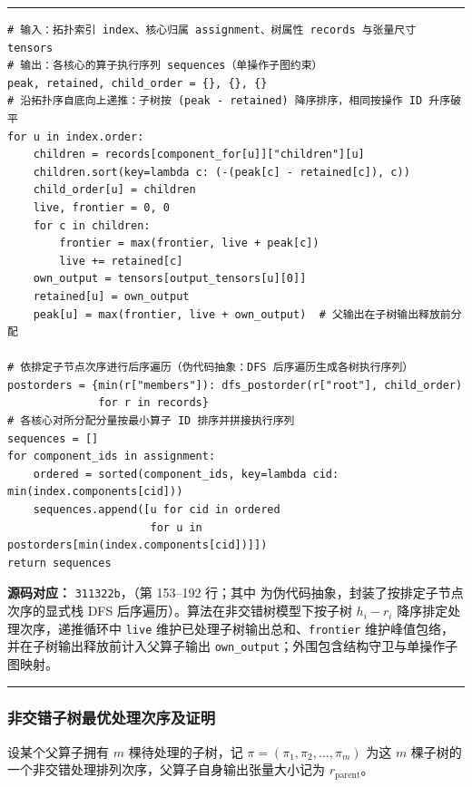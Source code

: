 \documentclass[anonymous,withtoc]{gmcm2026}
\begin{document}
\par{}\begingroup\normalsize
\captionsetup{type=algorithm,position=top,justification=raggedright,singlelinecheck=false,labelfont=bf}
\label{alg:p3-forest-memory-order}
\nopagebreak\hrule\nopagebreak


\begin{lstlisting}[style=paperpseudo]
# 输入：拓扑索引 index、核心归属 assignment、树属性 records 与张量尺寸 tensors
# 输出：各核心的算子执行序列 sequences（单操作子图约束）
peak, retained, child_order = {}, {}, {}
# 沿拓扑序自底向上递推：子树按 (peak - retained) 降序排序，相同按操作 ID 升序破平
for u in index.order:
    children = records[component_for[u]]["children"][u]
    children.sort(key=lambda c: (-(peak[c] - retained[c]), c))
    child_order[u] = children
    live, frontier = 0, 0
    for c in children:
        frontier = max(frontier, live + peak[c])
        live += retained[c]
    own_output = tensors[output_tensors[u][0]]
    retained[u] = own_output
    peak[u] = max(frontier, live + own_output)  # 父输出在子树输出释放前分配

# 依排定子节点次序进行后序遍历（伪代码抽象：DFS 后序遍历生成各树执行序列）
postorders = {min(r["members"]): dfs_postorder(r["root"], child_order)
              for r in records}
# 各核心对所分配分量按最小算子 ID 排序并拼接执行序列
sequences = []
for component_ids in assignment:
    ordered = sorted(component_ids, key=lambda cid: min(index.components[cid]))
    sequences.append([u for cid in ordered
                      for u in postorders[min(index.components[cid])]])
return sequences
\end{lstlisting}
\textbf{源码对应：} \texttt{311322b}，\texttt{}（第 153--192 行；其中 \texttt{} 为伪代码抽象，封装了按排定子节点次序的显式栈 DFS 后序遍历）。算法在非交错树模型下按子树 \(h_i - r_i\) 降序排定处理次序，递推循环中 \texttt{live} 维护已处理子树输出总和、\texttt{frontier} 维护峰值包络，并在子树输出释放前计入父算子输出 \texttt{own\_output}；外围包含结构守卫与单操作子图映射。

\par\hrule\endgroup

\subsubsection{非交错子树最优处理次序及证明}

设某个父算子拥有 \(m\) 棵待处理的子树，记 \(\pi = (\pi_1, \pi_2, \dots, \pi_m)\) 为这 \(m\) 棵子树的一个非交错处理排列次序，父算子自身输出张量大小记为 \(r_{\mathrm{parent}}\)。
\end{document}
